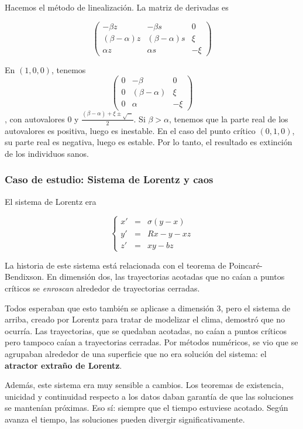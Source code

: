 Hacemos el método de linealización. La matriz de derivadas es

\[ \begin{pmatrix}
-βz & -βs & 0 \\
(β-α)z & (β-α)s & ξ \\
αz & αs & -ξ 
\end{pmatrix} \]

En $(1,0,0)$, tenemos \[ \begin{pmatrix}
0 & -β & 0 \\
0 & (β-α) & ξ \\
0 & α & -ξ 
\end{pmatrix} \], con autovalores $0$ y $\frac{(β-α) + ξ \pm \sqrt{\cdots}}{2}$. Si $β>α$, tenemos que la parte real de los autovalores es positiva, luego es inestable. En el caso del punto crítico $(0,1,0)$, su parte real es negativa, luego es estable. Por lo tanto, el resultado es extinción de los individuos sanos.

\subsubsection{Caso de estudio: Sistema de Lorentz y caos}

El sistema de Lorentz era

\[ \left\{\begin{array}{rcl} 
x' &=& σ(y-x) \\ 
y' &=& Rx - y -xz \\
z' &=& xy -bz
 \end{array}\right. \]
 
La historia de este sistema está relacionada con el teorema de Poincaré-Bendixson. En dimensión dos, las trayectorias acotadas que no caían a puntos críticos se \textit{enroscan} alrededor de trayectorias cerradas.
 
Todos esperaban que esto también se aplicase a dimensión 3, pero el sistema de arriba, creado por Lorentz para tratar de modelizar el clima, demostró que no ocurría. Las trayectorias, que se quedaban acotadas, no caían a puntos críticos pero tampoco caían a trayectorias cerradas. Por métodos numéricos, se vio que se agrupaban alrededor de una superficie que no era solución del sistema: el \textbf{atractor extraño de Lorentz}.
 
Además, este sistema era muy sensible a cambios. Los teoremas de existencia, unicidad y continuidad respecto a los datos daban garantía de que las soluciones se mantenían próximas. Eso sí: siempre que el tiempo estuviese acotado. Según avanza el tiempo, las soluciones pueden divergir significativamente.